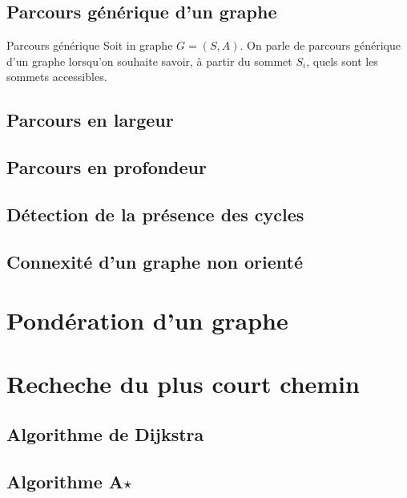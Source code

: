 \subsection{Parcours générique d'un graphe}

\begin{defi}{Parcours générique}
Soit in graphe $G=(S,A)$. On parle de parcours générique d'un graphe lorsqu'on souhaite savoir, à partir du sommet $S_i$, quels sont les sommets accessibles. 
\end{defi}

\subsection{Parcours en largeur}

\subsection{Parcours en profondeur}

\subsection{Détection de la présence des cycles}

\subsection{Connexité d'un graphe non orienté}

\section{Pondération d'un graphe}



\section{Recheche du plus court chemin}
\subsection{Algorithme de Dijkstra}

\subsection{Algorithme A$\star$}

\begin{defi}{}
\end{defi}

\begin{defi}{}
\end{defi}

\begin{defi}{}
\end{defi}

\begin{defi}{}
\end{defi}

\begin{defi}{}
\end{defi}
